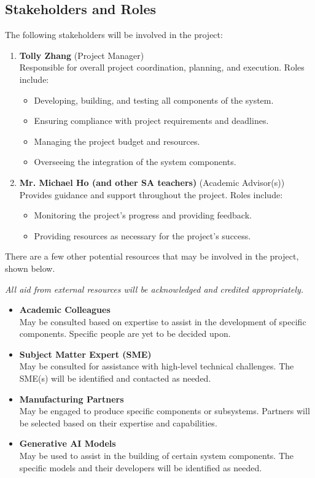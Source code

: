 \documentclass[12pt]{article}
\begin{document}
\subsection{Stakeholders and Roles}
The following stakeholders will be involved in the project:
\begin{enumerate}
    \item \textbf{Tolly Zhang} (Project Manager) \\
    Responsible for overall project coordination, planning, and execution. Roles include:
    \begin{itemize}
        \item Developing, building, and testing all components of the system.
        \item Ensuring compliance with project requirements and deadlines.
        \item Managing the project budget and resources.
        \item Overseeing the integration of the system components.
    \end{itemize}
    \item \textbf{Mr. Michael Ho (and other SA teachers)} (Academic Advisor(s)) \\
    Provides guidance and support throughout the project. Roles include:
    \begin{itemize}
        \item Monitoring the project's progress and providing feedback.
        \item Providing resources as necessary for the project's success.
    \end{itemize}
\end{enumerate}
There are a few other potential resources that may be involved in the project, shown below.

\textit{All aid from external resources will be acknowledged and credited appropriately.}
\begin{itemize}
    \item \textbf{Academic Colleagues} \\
    May be consulted based on expertise to assist in the development of specific components. Specific people are yet to be decided upon.
    \item \textbf{Subject Matter Expert (SME)} \\
    May be consulted for assistance with high-level technical challenges. The SME(s) will be identified and contacted as needed.
    \item \textbf{Manufacturing Partners} \\
    May be engaged to produce specific components or subsystems. Partners will be selected based on their expertise and capabilities.
    \item \textbf{Generative AI Models} \\
    May be used to assist in the building of certain system components. The specific models and their developers will be identified as needed.
\end{itemize}
\end{document}
